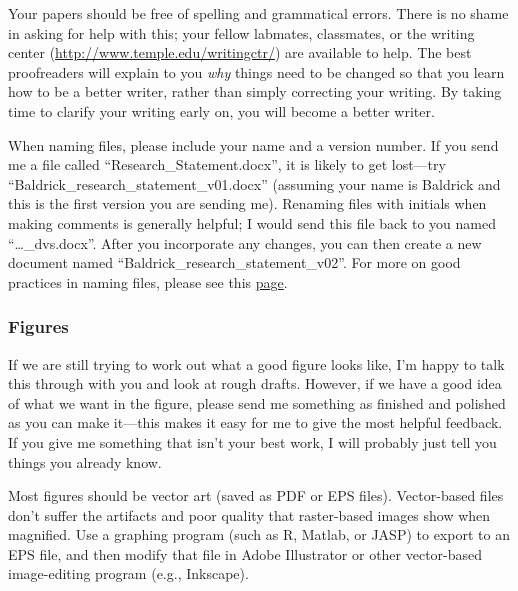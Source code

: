 \documentclass[letterpaper,12pt,oneside]{memoir}
\begin{document}
{Your papers should be free of spelling and grammatical errors. There is no shame in asking for help with this; your fellow labmates, classmates, or the writing center (\url{http://www.temple.edu/writingctr/}) are available to help. The best proofreaders will explain to you \textit{why} things need to be changed so that you learn how to be a better writer, rather than simply correcting your writing. By taking time to clarify your writing early on, you will become a better writer.



\begin{shaded}
\noindent When naming files, please include your name and a version number. If you send me a file called ``Research\_Statement.docx'', it is likely to get lost---try ``Baldrick\_research\_statement\_v01.docx'' (assuming your name is Baldrick and this is the first version you are sending me). Renaming files with initials when making comments is generally helpful; I would send this file back to you named ``\ldots\_dvs.docx''. After you incorporate any changes, you can then create a new document named ``Baldrick\_research\_statement\_v02''. For more on good practices in naming files, please see this \href{http://www2.stat.duke.edu/~rcs46/lectures_2015/01-markdown-git/slides/naming-slides/naming-slides.pdf}{page}.
\end{shaded}

\subsubsection{Figures}
If we are still trying to work out what a good figure looks like, I'm happy to talk this through with you and look at rough drafts. However, if we have a good idea of what we want in the figure, please send me something as finished and polished as you can make it---this makes it easy for me to give the most helpful feedback. If you give me something that isn't your best work, I will probably just tell you things you already know.

Most figures should be vector art (saved as PDF or EPS files). Vector-based files don't suffer the artifacts and poor quality that raster-based images show when magnified. Use a graphing program (such as R, Matlab, or JASP) to export to an EPS file, and then modify that file in Adobe Illustrator or other vector-based image-editing program (e.g., Inkscape).

}
\end{document}
